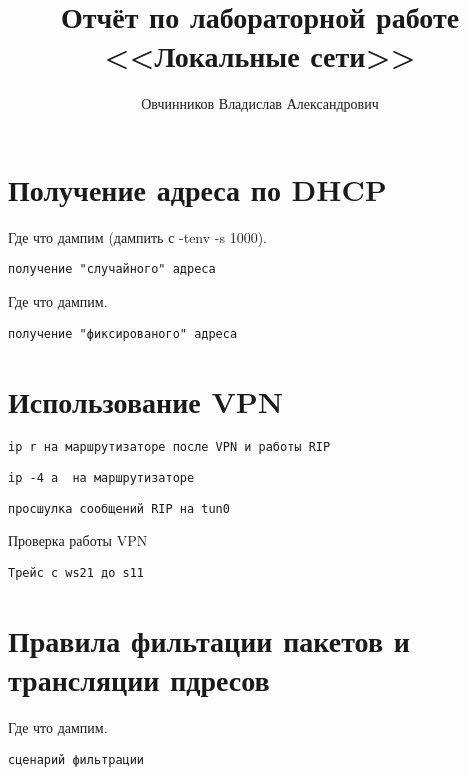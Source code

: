 \documentclass[a4paper,12pt]{article}
\title{Отчёт по лабораторной работе \\ <<Локальные сети>>}
\author{Овчинников Владислав Александрович}
\begin{document}
\maketitle

\tableofcontents


\section{Получение адреса по DHCP}

Где что дампим (дампить с -tenv -s 1000).

\begin{Verbatim}
получение "случайного" адреса
\end{Verbatim}

Где что дампим.

\begin{Verbatim}
получение "фиксированого" адреса
\end{Verbatim}


\section{Использование VPN}

\begin{Verbatim}
ip r на маршрутизаторе после VPN и работы RIP
\end{Verbatim}

\begin{Verbatim}
ip -4 a  на маршрутизаторе
\end{Verbatim}

\begin{Verbatim}
просшулка сообщений RIP на tun0
\end{Verbatim}

Проверка работы VPN

\begin{Verbatim}
Трейс с ws21 до s11
\end{Verbatim}

\section{Правила фильтации пакетов и трансляции пдресов}

Где что дампим. 

\begin{Verbatim}
сценарий фильтрации
\end{Verbatim}
\end{document}
